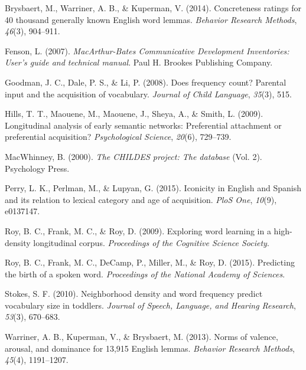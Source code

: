 \documentclass[10pt, letterpaper]{article}
\begin{document}
\setlength{\parindent}{-0.1in} \setlength{\leftskip}{0.125in} \noindent

Brysbaert, M., Warriner, A. B., \& Kuperman, V. (2014). Concreteness
ratings for 40 thousand generally known English word lemmas.
\emph{Behavior Research Methods}, \emph{46}(3), 904--911.

Fenson, L. (2007). \emph{MacArthur-Bates Communicative Development
Inventories: User's guide and technical manual}. Paul H. Brookes
Publishing Company.

Goodman, J. C., Dale, P. S., \& Li, P. (2008). Does frequency count?
Parental input and the acquisition of vocabulary. \emph{Journal of Child
Language}, \emph{35}(3), 515.

Hills, T. T., Maouene, M., Maouene, J., Sheya, A., \& Smith, L. (2009).
Longitudinal analysis of early semantic networks: Preferential
attachment or preferential acquisition? \emph{Psychological Science},
\emph{20}(6), 729--739.

MacWhinney, B. (2000). \emph{The CHILDES project: The database} (Vol.
2). Psychology Press.

Perry, L. K., Perlman, M., \& Lupyan, G. (2015). Iconicity in English
and Spanish and its relation to lexical category and age of acquisition.
\emph{PloS One}, \emph{10}(9), e0137147.

Roy, B. C., Frank, M. C., \& Roy, D. (2009). Exploring word learning in
a high-density longitudinal corpus. \emph{Proceedings of the Cognitive
Science Society}.

Roy, B. C., Frank, M. C., DeCamp, P., Miller, M., \& Roy, D. (2015).
Predicting the birth of a spoken word. \emph{Proceedings of the National
Academy of Sciences}.

Stokes, S. F. (2010). Neighborhood density and word frequency predict
vocabulary size in toddlers. \emph{Journal of Speech, Language, and
Hearing Research}, \emph{53}(3), 670--683.

Warriner, A. B., Kuperman, V., \& Brysbaert, M. (2013). Norms of
valence, arousal, and dominance for 13,915 English lemmas.
\emph{Behavior Research Methods}, \emph{45}(4), 1191--1207.
\end{document}
